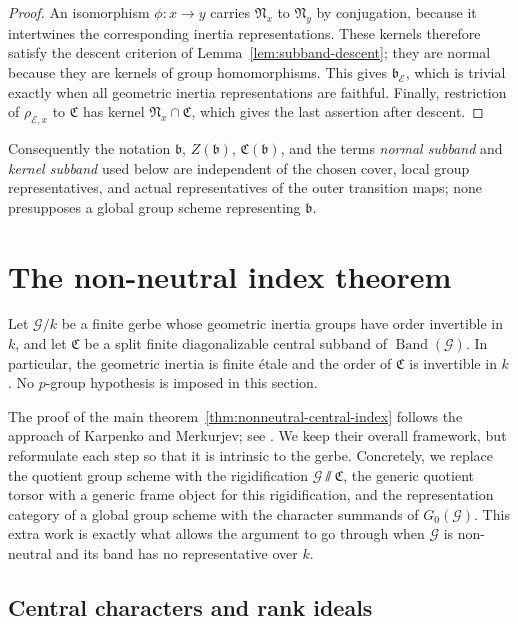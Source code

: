 \documentclass[11pt,reqno]{amsart}
\numberwithin{equation}{section}
\theoremstyle{plain}
\theoremstyle{definition}
\def\cG{{\mathcal G}}
\def\cE{{\mathcal E}}
\def\fC{{\mathfrak C}}
\def\fN{{\mathfrak N}}
\def\band{{\mathfrak b}}
\begin{document}
\begin{proof}
An isomorphism $\phi:x\to y$ carries $\fN_x$ to $\fN_y$ by
conjugation, because it intertwines the corresponding inertia
representations.  These kernels therefore satisfy the descent criterion
of Lemma~\ref{lem:subband-descent}; they are normal because they are
kernels of group homomorphisms.  This gives $\band_{\cE}$, which is trivial exactly when all geometric inertia
representations are faithful.  Finally, restriction of
$\rho_{\cE,x}$ to $\fC$ has kernel $\fN_x\cap\fC$, which gives the last
assertion after descent.
\end{proof}

Consequently the notation $\band$, $Z(\band)$, $\fC(\band)$, and the
terms \emph{normal subband} and \emph{kernel subband} used below are
independent of the chosen cover, local group representatives, and actual
representatives of the outer transition maps; none presupposes a global
group scheme representing $\band$.

\section{The non-neutral index theorem}
\label{sec:central-index}

Let $\cG/k$ be a finite gerbe whose geometric inertia groups have order
invertible in $k$, and let $\fC$ be a split finite diagonalizable central
subband of $\operatorname{Band}(\cG)$.  In particular, the geometric inertia is
finite \'etale and the order of $\fC$ is invertible in $k$.  No $p$-group
hypothesis is imposed in this section.

The proof of the main theorem~\ref{thm:nonneutral-central-index} follows the approach of Karpenko and Merkurjev; see \cite[Theorem~4.4 and Remark~4.5]{KM}. We keep their overall framework, but reformulate each step so that it is intrinsic to the gerbe. Concretely, we replace the quotient group scheme with the rigidification $\cG\sslash\fC$, the generic quotient torsor with a generic frame object for this rigidification, and the representation category of a global group scheme with the character summands of $G_0(\cG)$. This extra work is exactly what allows the argument to go through when $\cG$ is non-neutral and its band has no representative over $k$.

\subsection{Central characters and rank ideals}
\end{document}
